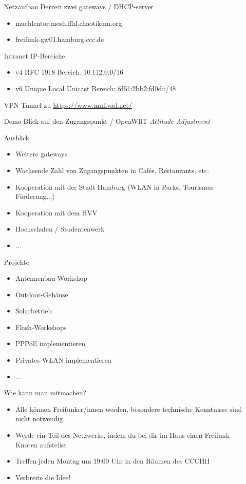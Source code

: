 \documentclass[c]{beamer}
\begin{document}
\begin{frame}{Netzaufbau}
	Derzeit zwei gateways / DHCP-server
	\begin{itemize}
		\item muehlentor.mesh.ffhl.chaotikum.org
		\item freifunk-gw01.hamburg.ccc.de
	\end{itemize}
	Intranet IP-Bereiche
	\begin{itemize}
		\item v4 RFC 1918  Bereich: 10.112.0.0/16
		\item v6 Unique Local Unicast Bereich: fd51:2bb2:fd0d::/48 
	\end{itemize}
	VPN-Tunnel zu \href{https://www.mullvad.net/}{https://www.mullvad.net/}
\end{frame}


\begin{frame}{Demo}
	Blick auf den Zugangspunkt / OpenWRT \it Attitude Adjustment
\end{frame}


\begin{frame}{Ausblick}
	\begin{itemize}
		\item Weitere gateways
		\item Wachsende Zahl von Zugangspunkten in Cafés, Restaurants, etc.
		\item Kooperation mit der Stadt Hamburg (WLAN in Parks, Tourismus-Förderung...)
		\item Kooperation mit dem HVV
		\item Hochschulen / Studentenwerk
		\item ...
	\end{itemize}
\end{frame}


\begin{frame}{Projekte}
	\begin{itemize}
		\item Antennenbau-Workshop
		\item Outdoor-Gehäuse
		\item Solarbetrieb
		\item Flash-Workshops
		\item PPPoE implementieren
		\item Privates WLAN implementieren
		\item ...
	\end{itemize}
\end{frame}


\begin{frame}{Wie kann man mitmachen?}
	\begin{itemize}
		\item Alle können Freifunker/innen werden, besondere technische Kenntnisse sind nicht notwendig
		\item Werde ein Teil des Netzwerks, indem du bei dir im Haus einen Freifunk-Knoten aufstellst
		\item Treffen jeden Montag um 19:00 Uhr in den Räumen des CCCHH
		\item Verbreite die Idee!
	\end{itemize}
\end{frame}
\end{document}
